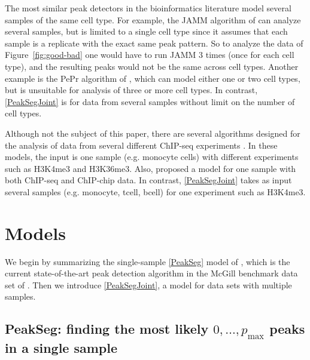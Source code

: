 \documentclass{article} %
\begin{document}
The most similar peak detectors in the bioinformatics literature model
several samples of the same cell type. For example, the JAMM algorithm
of \citet{JAMM} can analyze several samples, but is limited to a
single cell type since it assumes that each sample is a replicate with
the exact same peak pattern. So to analyze the data of
Figure~\ref{fig:good-bad} one would have to run JAMM 3 times (once for
each cell type), and the resulting peaks would not be the same across
cell types. Another example is the PePr algorithm of \citet{PePr},
which can model either one or two cell types, but is unsuitable for
analysis of three or more cell types. In contrast, \ref{PeakSegJoint}
is for data from several samples without limit on the number of cell
types.

Although not the subject of this paper, there are several algorithms
designed for the analysis of data from several different ChIP-seq
experiments \citep{chromhmm,segway,jmosaics}. In these models, the
input is one sample (e.g. monocyte cells) with different experiments
such as H3K4me3 and H3K36me3. Also,
\citet{hierarchical-joint} proposed a model for one sample with both
ChIP-seq and ChIP-chip data. In contrast, 
\ref{PeakSegJoint} takes as input several samples
(e.g. monocyte, tcell, bcell) for one experiment such as H3K4me3.

\section{Models}\label{sec:models}

We begin by summarizing the single-sample \ref{PeakSeg} model of
\citet{HOCKING-PeakSeg}, which is the current state-of-the-art peak
detection algorithm in the McGill benchmark data set of
\citet{hocking2014visual}. Then we introduce \ref{PeakSegJoint}, a
model for data sets with multiple samples.

\subsection{PeakSeg: finding the most likely $0,\dots,p_{\text{max}}$
  peaks in a single sample}
\end{document}
